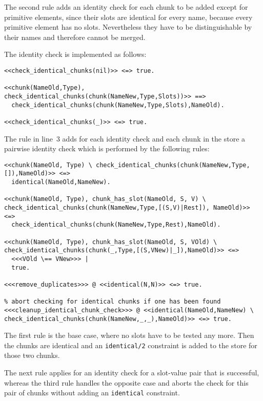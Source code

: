 The second rule adds an identity check for each chunk to be added except for primitive elements, since their slots are identical for every name, because every primitive element has no slots. Nevertheless they have to be distinguishable by their names and therefore cannot be merged.

The identity check is implemented as follows:

\begin{lstlisting}
<<check_identical_chunks(nil)>> <=> true.

<<chunk(NameOld,Type), check_identical_chunks(chunk(NameNew,Type,Slots))>> ==> 
  check_identical_chunks(chunk(NameNew,Type,Slots),NameOld).
  
<<check_identical_chunks(_)>> <=> true.
\end{lstlisting}

The rule in line~3 adds for each identity check and each chunk in the store a pairwise identity check which is performed by the following rules:

\begin{lstlisting}
<<chunk(NameOld, Type) \ check_identical_chunks(chunk(NameNew,Type,[]),NameOld)>> <=> 
  identical(NameOld,NameNew).
  
<<chunk(NameOld, Type), chunk_has_slot(NameOld, S, V) \ check_identical_chunks(chunk(NameNew,Type,[(S,V)|Rest]), NameOld)>> <=> 
  check_identical_chunks(chunk(NameNew,Type,Rest),NameOld).
  
<<chunk(NameOld, Type), chunk_has_slot(NameOld, S, VOld) \ check_identical_chunks(chunk(_,Type,[(S,VNew)|_]),NameOld)>> <=> 
  <<<VOld \== VNew>>> |
  true.
    
<<<remove_duplicates>>> @ <<identical(N,N)>> <=> true.

% abort checking for identical chunks if one has been found
<<<cleanup_identical_chunk_check>>> @ <<identical(NameOld,NameNew) \ check_identical_chunks(chunk(NameNew,_,_),NameOld)>> <=> true.
\end{lstlisting}

The first rule is the base case, where no slots have to be tested any more. Then the chunks are identical and an \lstinline|identical/2| constraint is added to the store for those two chunks.

The next rule applies for an identity check for a slot-value pair that is successful, whereas the third rule handles the opposite case and aborts the check for this pair of chunks without adding an \lstinline|identical| constraint.

